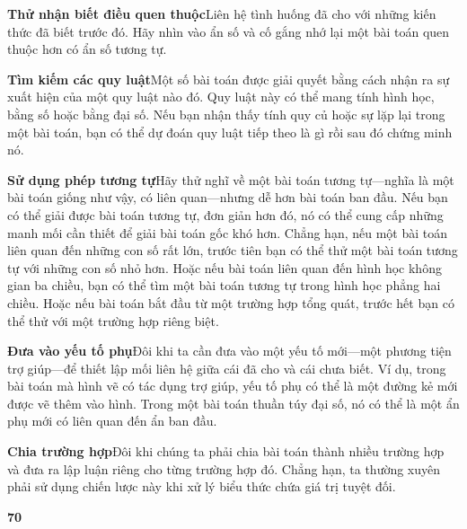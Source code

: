 \begin{minipage}[t]{0.72\textwidth}
    \vspace{0.2cm}
    \textbf{\textsf{\textcolor{stewartblue}{Thử nhận biết điều quen thuộc}}}\quad Liên hệ tình huống đã cho với những kiến thức đã biết trước đó. Hãy nhìn vào ẩn số và cố gắng nhớ lại một bài toán quen thuộc hơn có ẩn số tương tự.

    \vspace{0.18cm}
    \textbf{\textsf{\textcolor{stewartblue}{Tìm kiếm các quy luật}}}\quad Một số bài toán được giải quyết bằng cách nhận ra sự xuất hiện của một quy luật nào đó. Quy luật này có thể mang tính hình học, bằng số hoặc bằng đại số. Nếu bạn nhận thấy tính quy củ hoặc sự lặp lại trong một bài toán, bạn có thể dự đoán quy luật tiếp theo là gì rồi sau đó chứng minh nó.

    \vspace{0.18cm}
    \textbf{\textsf{\textcolor{stewartblue}{Sử dụng phép tương tự}}}\quad Hãy thử nghĩ về một bài toán tương tự—nghĩa là một bài toán giống như vậy, có liên quan—nhưng dễ hơn bài toán ban đầu. Nếu bạn có thể giải được bài toán tương tự, đơn giản hơn đó, nó có thể cung cấp những manh mối cần thiết để giải bài toán gốc khó hơn. Chẳng hạn, nếu một bài toán liên quan đến những con số rất lớn, trước tiên bạn có thể thử một bài toán tương tự với những con số nhỏ hơn. Hoặc nếu bài toán liên quan đến hình học không gian ba chiều, bạn có thể tìm một bài toán tương tự trong hình học phẳng hai chiều. Hoặc nếu bài toán bắt đầu từ một trường hợp tổng quát, trước hết bạn có thể thử với một trường hợp riêng biệt.

    \vspace{0.18cm}
    \textbf{\textsf{\textcolor{stewartblue}{Đưa vào yếu tố phụ}}}\quad Đôi khi ta cần đưa vào một yếu tố mới—một phương tiện trợ giúp—để thiết lập mối liên hệ giữa cái đã cho và cái chưa biết. Ví dụ, trong bài toán mà hình vẽ có tác dụng trợ giúp, yếu tố phụ có thể là một đường kẻ mới được vẽ thêm vào hình. Trong một bài toán thuần túy đại số, nó có thể là một ẩn phụ mới có liên quan đến ẩn ban đầu.

    \vspace{0.18cm}
    \textbf{\textsf{\textcolor{stewartblue}{Chia trường hợp}}}\quad Đôi khi chúng ta phải chia bài toán thành nhiều trường hợp và đưa ra lập luận riêng cho từng trường hợp đó. Chẳng hạn, ta thường xuyên phải sử dụng chiến lược này khi xử lý biểu thức chứa giá trị tuyệt đối.
\end{minipage}

\vfill
\noindent
\textbf{\textsf{70}}